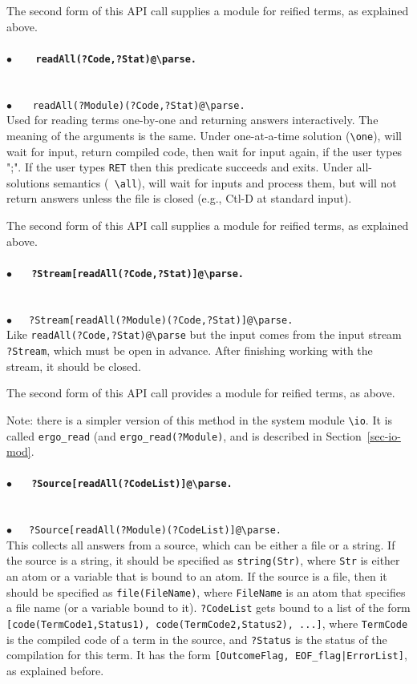 \documentclass[11pt]{article}
\newcommand{\bs}{\textbackslash}
\begin{document}
  \noindent
  The second form of this API call supplies a module for reified terms, as
explained above.
  \paragraph{$\bullet$~~~ \tt  readAll(?Code,?Stat)@\bs{}parse.} ~~\\
{$\bullet$~~~ \tt  readAll(?Module)(?Code,?Stat)@\bs{}parse.} ~~\\
Used for reading terms one-by-one and returning answers interactively.
The meaning of the arguments is the same.  Under one-at-a-time solution
({\tt \bs{}one}), will wait for input, return compiled code, then wait for
input again, if the user types ";". If the user types {\tt RET} then this
predicate succeeds and exits.  Under all-solutions semantics ({\tt
  \bs{}all}), will wait for inputs and process them, but will not return
answers unless the file is closed (e.g., Ctl-D at standard input).

\noindent
The second form of this API call supplies a module for reified terms, as
explained above.

\paragraph{$\bullet$~~~\tt  ?Stream[readAll(?Code,?Stat)]@\bs{}parse.} ~~\\
{$\bullet$~~~\tt  ?Stream[readAll(?Module)(?Code,?Stat)]@\bs{}parse.} ~~\\
Like \texttt{readAll(?Code,?Stat)@\bs{}parse}  but the input comes from
the input stream \texttt{?Stream}, which must be open in advance.
After finishing working with the stream, it should be closed. 

\noindent
The second form of this API call provides a module for reified terms, as
above.

\noindent
Note: there is a simpler version of this method in the system module
\texttt{\bs{}io}. It is called
\texttt{ergo\_read}
(and
\texttt{ergo\_read(?Module)},
and is described in Section~\ref{sec-io-mod}.


\paragraph{$\bullet$~~~\tt  ?Source[readAll(?CodeList)]@\bs{}parse.}~~\\
{$\bullet$~~~\tt ?Source[readAll(?Module)(?CodeList)]@\bs{}parse.}~~\\
This collects all answers from a source, which can be either a file or a
string. If the source is a string, it should be
specified as {\tt string(Str)}, where {\tt Str} is either an atom or a
variable that is bound to an atom. If the source is a file, then it should
be specified as {\tt file(FileName)}, where {\tt FileName} is an atom
that specifies a file name (or a variable bound to it).
{\tt ?CodeList} gets bound to a list
of the form {\tt [code(TermCode1,Status1), code(TermCode2,Status2),
  ...]}, where  
{\tt TermCode} is the compiled code of a term in the source, and
{\tt ?Status}  is the status of the compilation for this term. It has the
form {\tt [OutcomeFlag, EOF\_flag|ErrorList]}, as explained before.
\end{document}
